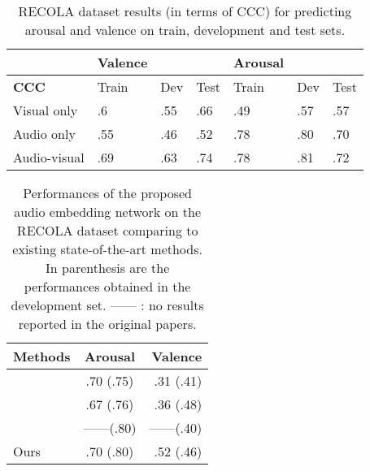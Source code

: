 \documentclass[times,twocolumn,final,authoryear]{elsarticle}
\begin{document}
	\begin{table}
		\caption{RECOLA dataset results (in terms of CCC) for predicting arousal and valence on train, development and test sets.}
		\begin{tabular}{l|lll|lll}
			\hline
			& \textbf{Valence}                    &                          &      & \textbf{Arousal}                    &                          &      \\ \hline
			\textbf{CCC}  & \multicolumn{1}{l|}{Train} & \multicolumn{1}{l|}{Dev} & Test & \multicolumn{1}{l|}{Train} & \multicolumn{1}{l|}{Dev} & Test \\ \hline
			Visual only & \multicolumn{1}{l|}{.6}    & \multicolumn{1}{l|}{.55} & .66  & \multicolumn{1}{l|}{.49}   & \multicolumn{1}{l|}{.57} & .57  \\ \hline
			Audio only  & \multicolumn{1}{l|}{.55}   & \multicolumn{1}{l|}{.46} & .52  & \multicolumn{1}{l|}{.78}   & \multicolumn{1}{l|}{.80}  & .70   \\ \hline
			Audio-visual & \multicolumn{1}{l|}{.69}   & \multicolumn{1}{l|}{.63} & .74  & \multicolumn{1}{l|}{.78}   & \multicolumn{1}{l|}{.81} & .72  \\ \hline
		\end{tabular}
		\label{tab:RECOLA_performances}
	\end{table}
	
	\begin{table}
		\caption{Performances of the proposed audio embedding network on the RECOLA dataset comparing to existing state-of-the-art methods. In parenthesis are the performances obtained in the development set. ------ : no results reported in the original papers.}
		\begin{tabular*}{\columnwidth}{l|c|r}
			\hline
			\textbf{Methods} & \textbf{Arousal} & \textbf{Valence}  \\
			\hline
			\cite{Tzarakis2017}& .70 (.75) & .31 (.41) \\
			\cite{Han2017} & .67 (.76) & .36 (.48) \\
			\cite{He2015} &------(.80) &------(.40) \\
			Ours & .70 (.80) & .52 (.46) \\
			\hline
		\end{tabular*}
		\label{tab:vggish_results_comparison}
	\end{table}
	
\end{document}
